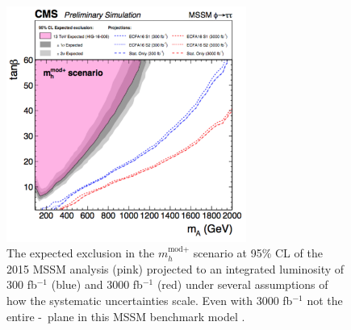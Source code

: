 \begin{figure}[h!]
\begin{center}
\includegraphics[width=0.7\textwidth]{./Conclusion/Figures/MSSMProjection.png}
\end{center}
\caption{The expected exclusion in the $m_{h}^{\text{mod+}}$ scenario
 at 95\% CL of the 2015 MSSM analysis (pink)
projected to an integrated luminosity of 300 fb$^{-1}$ (blue) and 3000 fb$^{-1}$ (red)
under several assumptions of how the systematic uncertainties scale. Even with 3000 fb$^{-1}$
not the entire \mA-\tanb~plane in this MSSM benchmark model \cite{HTT-projection}.}
\label{fig:mssm_projection_fig}
\end{figure}

